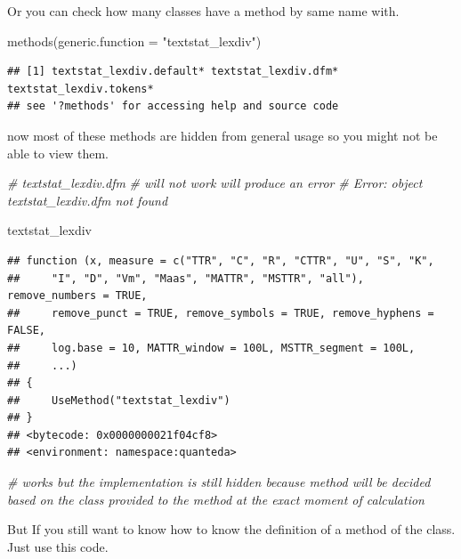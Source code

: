 \documentclass[
]{book}
\newenvironment{Shaded}{\begin{snugshade}}{\end{snugshade}}
\newcommand{\AttributeTok}[1]{\textcolor[rgb]{0.77,0.63,0.00}{#1}}
\newcommand{\CommentTok}[1]{\textcolor[rgb]{0.56,0.35,0.01}{\textit{#1}}}
\newcommand{\FunctionTok}[1]{\textcolor[rgb]{0.00,0.00,0.00}{#1}}
\newcommand{\NormalTok}[1]{#1}
\newcommand{\StringTok}[1]{\textcolor[rgb]{0.31,0.60,0.02}{#1}}
\begin{document}
Or you can check how many classes have a method by same name with.

\begin{Shaded}
\begin{Highlighting}[]
\FunctionTok{methods}\NormalTok{(}\AttributeTok{generic.function =} \StringTok{"textstat\_lexdiv"}\NormalTok{)}
\end{Highlighting}
\end{Shaded}

\begin{verbatim}
## [1] textstat_lexdiv.default* textstat_lexdiv.dfm*     textstat_lexdiv.tokens* 
## see '?methods' for accessing help and source code
\end{verbatim}

now most of these methods are hidden from general usage so you might not be able to view them.

\begin{Shaded}
\begin{Highlighting}[]
\CommentTok{\# textstat\_lexdiv.dfm }
\CommentTok{\# will not work will produce an error}
\CommentTok{\# Error: object \textquotesingle{}textstat\_lexdiv.dfm\textquotesingle{} not found}

\NormalTok{textstat\_lexdiv}
\end{Highlighting}
\end{Shaded}

\begin{verbatim}
## function (x, measure = c("TTR", "C", "R", "CTTR", "U", "S", "K", 
##     "I", "D", "Vm", "Maas", "MATTR", "MSTTR", "all"), remove_numbers = TRUE, 
##     remove_punct = TRUE, remove_symbols = TRUE, remove_hyphens = FALSE, 
##     log.base = 10, MATTR_window = 100L, MSTTR_segment = 100L, 
##     ...) 
## {
##     UseMethod("textstat_lexdiv")
## }
## <bytecode: 0x0000000021f04cf8>
## <environment: namespace:quanteda>
\end{verbatim}

\begin{Shaded}
\begin{Highlighting}[]
\CommentTok{\# works but the implementation is still hidden because method will be decided based on the class provided to the method at the exact moment of calculation}
\end{Highlighting}
\end{Shaded}

But If you still want to know how to know the definition of a method of the class. Just use this code.
\end{document}
